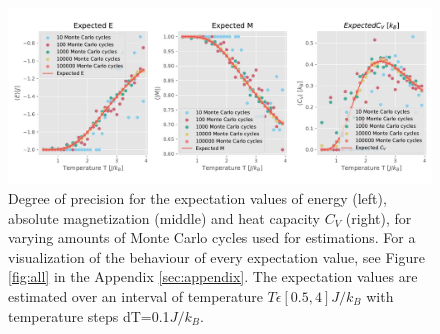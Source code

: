 \documentclass[10pt, nofootinbib, twocolumn]{revtex4-1}
\begin{document}
\begin{figure}
    \centering
    \includegraphics[width = 1\textwidth]{figures/mcc_comp.pdf} 
    \caption{Degree of precision for the expectation values of energy (left), absolute magnetization (middle) and heat capacity $C_V$ (right), for varying amounts of Monte Carlo cycles used for estimations. For a visualization of the behaviour of every expectation value, see Figure \ref{fig:all} in the Appendix \ref{sec:appendix}. The expectation values are estimated over an interval of temperature $T\epsilon [0.5,4]J/k_B$ with temperature steps dT=0.1$J/k_B$.}
    \label{fig: fig2}
\end{figure} 

\newpage
\end{document}
